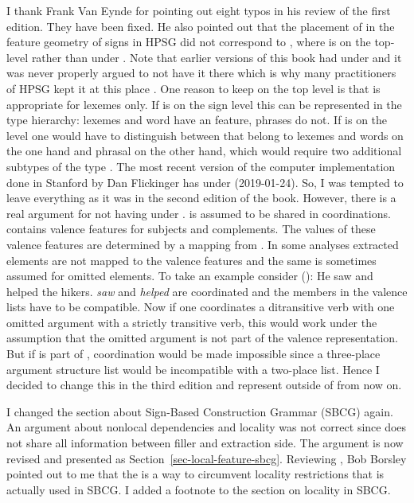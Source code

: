 I thank Frank Van Eynde for pointing out eight typos in his review of the first edition. They have
been fixed. He also pointed out that the placement of \argst in the feature geometry of signs in
HPSG did not correspond to , where \argst is on the top-level rather than under
\cat. Note that earlier versions of this book had \argst under \cat and it was never properly argued
to not have it there which is why many practitioners of HPSG kept it at this place
\citep{MuellerLFGphrasal}. One reason to keep \argst on the top level is that \argst is appropriate
for lexemes only. If \argst is on the sign level this can be represented in the type hierarchy:
lexemes and word have an \argst feature, phrases do not. If \argst is on the \cat level one would
have to distinguish between \catvs that belong to lexemes and words on the one hand and phrasal
\catvs on the other hand, which would require two additional subtypes of the type . 
The most recent version of the computer implementation done in Stanford by Dan Flickinger has \argst
under \local (2019-01-24). So, I was tempted to leave everything as it was in the second edition of
the book. However, there is a real argument for not having \argst under \cat. \cat is assumed to be
shared in coordinations. \cat contains valence features for subjects and complements. The values of
these valence features are determined by a mapping from \argst. In some analyses extracted elements
are not mapped to the valence features and the same is sometimes assumed for omitted elements. To
take an example consider ():
\ea
He saw and helped the hikers.
\z
\emph{saw} and \emph{helped} are coordinated and the members in the valence lists have to be
compatible. Now if one coordinates a ditransitive verb with one omitted argument with a strictly
transitive verb, this would work under the assumption that the omitted argument is not part of the
valence representation. But if \argst is part of \cat, coordination would be made impossible since a
three-place argument structure list would be incompatible with a two-place list. Hence I decided to
change this in the third edition and represent \argst outside of \cat from now on.

I changed the section about Sign-Based Construction Grammar (SBCG) again. An argument about nonlocal
dependencies and locality was not correct since \citet[]{Sag2012a} does not share all
information between filler and extraction side. The argument is now revised and presented as
Section~\ref{sec-local-feature-sbcg}. Reviewing , Bob Borsley pointed out to me that the \xargf is a way to
circumvent locality restrictions that is actually used in SBCG. I added a footnote to the section on
locality in SBCG.

